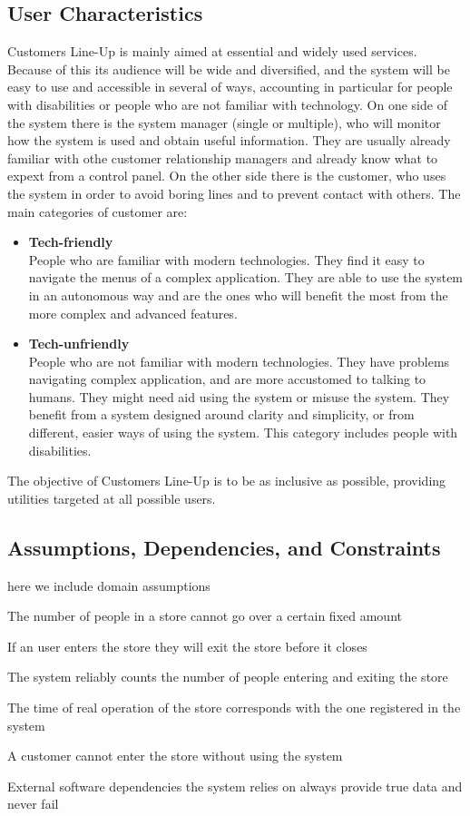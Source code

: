 \subsection{User Characteristics}
Customers Line-Up is mainly aimed at essential and widely used services.
Because of this its audience will be wide and diversified, and the system will be easy to use and accessible in several of ways, accounting in particular for people with disabilities or people who are not familiar with technology.
On one side of the system there is the system manager (single or multiple), who will monitor how the system is used and obtain useful information.
They are usually already familiar with othe customer relationship managers and already know what to expext from a control panel.
On the other side there is the customer, who uses the system in order to avoid boring lines and to prevent contact with others.
The main categories of customer are:
\begin{itemize}
    \item \textbf{Tech-friendly}\\
        People who are familiar with modern technologies. They find it easy to navigate the menus of a complex application.
        They are able to use the system in an autonomous way and are the ones who will benefit the most from the more complex and advanced features.
    \item \textbf{Tech-unfriendly}\\
        People who are not familiar with modern technologies. They have problems navigating complex application, and are more accustomed to talking to humans.
        They might need aid using the system or misuse the system. They benefit from a system designed around clarity and simplicity, or from different, easier ways of using the system.
        This category includes people with disabilities.
\end{itemize}

The objective of Customers Line-Up is to be as inclusive as possible, providing utilities targeted at all possible users.

\subsection{Assumptions, Dependencies, and Constraints}
here we include domain assumptions 
\begin{enumerate}[label={[D\arabic*]}]
    \item The number of people in a store cannot go over a certain fixed amount
    \item If an user enters the store they will exit the store before it closes
    \item {}The system reliably counts the number of people entering and exiting the store
    \item The time of real operation of the store corresponds with the one registered in the system
    \item A customer cannot enter the store without using the system
    \item External software dependencies the system relies on always provide true data and never fail
\end{enumerate}